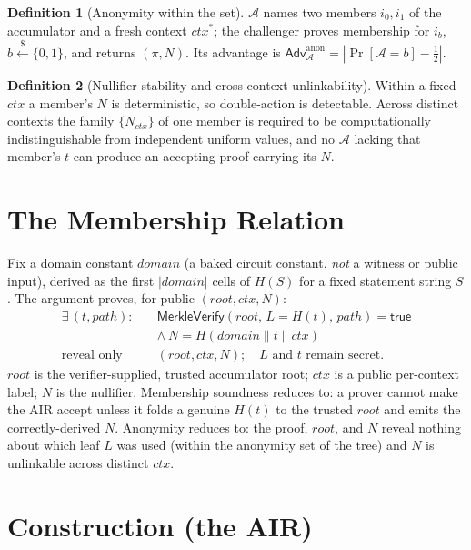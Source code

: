 \documentclass[11pt]{article}
\newcommand{\cat}{\mathbin{\|}}          %
\newcommand{\Adv}{\mathsf{Adv}}
\theoremstyle{plain}
\theoremstyle{definition}
\newtheorem{definition}{Definition}
\begin{document}
\begin{definition}[Anonymity within the set]
$\mathcal{A}$ names two members $i_0, i_1$ of the accumulator and a fresh context $\mathit{ctx}^\ast$;
the challenger proves membership for $i_b$, $b \xleftarrow{\$} \{0,1\}$, and returns $(\pi, N)$. Its
advantage is $\Adv^{\mathrm{anon}}_{\mathcal{A}} = |\Pr[\mathcal{A} = b] - \tfrac12|$.
\end{definition}

\begin{definition}[Nullifier stability and cross-context unlinkability]
Within a fixed $\mathit{ctx}$ a member's $N$ is deterministic, so double-action is detectable. Across
distinct contexts the family $\{N_{\mathit{ctx}}\}$ of one member is required to be computationally
indistinguishable from independent uniform values, and no $\mathcal{A}$ lacking that member's $t$ can
produce an accepting proof carrying its $N$.
\end{definition}

\section{The Membership Relation}

Fix a domain constant $\mathit{domain}$ (a baked circuit constant, \emph{not} a witness or public
input), derived as the first $|\mathit{domain}|$ cells of $H(S)$ for a fixed statement string $S$.
The argument proves, for public $(\mathit{root}, \mathit{ctx}, N)$:
\[
\begin{aligned}
\exists\,(t, \mathit{path}) :\quad
  & \textsf{MerkleVerify}(\mathit{root},\, L = H(t),\, \mathit{path}) = \textsf{true} \\
  & \wedge\ N = H(\mathit{domain} \cat t \cat \mathit{ctx}) \\
\text{reveal only } & (\mathit{root}, \mathit{ctx}, N); \quad L \text{ and } t \text{ remain secret.}
\end{aligned}
\]
$\mathit{root}$ is the verifier-supplied, trusted accumulator root; $\mathit{ctx}$ is a public
per-context label; $N$ is the nullifier. Membership soundness reduces to: a prover cannot make the
AIR accept unless it folds a genuine $H(t)$ to the trusted $\mathit{root}$ and emits the
correctly-derived $N$. Anonymity reduces to: the proof, $\mathit{root}$, and $N$ reveal nothing about
which leaf $L$ was used (within the anonymity set of the tree) and $N$ is unlinkable across distinct
$\mathit{ctx}$.

\section{Construction (the AIR)}
\end{document}
